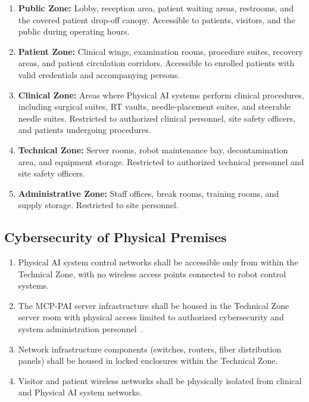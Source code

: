 \documentclass[11pt,letterpaper]{article}
\begin{document}
\begin{enumerate}[label=(\alph*)]
\item \textbf{Public Zone:} Lobby, reception area, patient waiting areas,
  restrooms, and the covered patient drop-off canopy. Accessible to patients,
  visitors, and the public during operating hours.

\item \textbf{Patient Zone:} Clinical wings, examination rooms, procedure
  suites, recovery areas, and patient circulation corridors. Accessible to
  enrolled patients with valid credentials and accompanying persons.

\item \textbf{Clinical Zone:} Areas where Physical AI systems perform clinical
  procedures, including surgical suites, RT vaults, needle-placement suites,
  and steerable needle suites. Restricted to authorized clinical personnel,
  site safety officers, and patients undergoing procedures.

\item \textbf{Technical Zone:} Server rooms, robot maintenance bay,
  decontamination area, and equipment storage. Restricted to authorized
  technical personnel and site safety officers.

\item \textbf{Administrative Zone:} Staff offices, break rooms, training rooms,
  and supply storage. Restricted to site personnel.
\end{enumerate}

\subsection{Cybersecurity of Physical Premises}

\begin{enumerate}[label=(\alph*)]
\item Physical AI system control networks shall be accessible only from within
  the Technical Zone, with no wireless access points connected to robot control
  systems.

\item The MCP-PAI server infrastructure shall be housed in the Technical Zone
  server room with physical access limited to authorized cybersecurity and
  system administration personnel~\cite{iche6r3adapt}.

\item Network infrastructure components (switches, routers, fiber distribution
  panels) shall be housed in locked enclosures within the Technical Zone.

\item Visitor and patient wireless networks shall be physically isolated from
  clinical and Physical AI system networks.
\end{enumerate}
\end{document}
